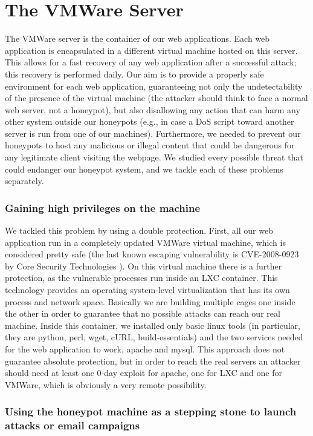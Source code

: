 \section{The VMWare Server}

The VMWare server is the container of our web applications. Each web application is encapsulated in a different virtual machine hosted on this server. This allows for a fast recovery of any web application after a successful attack; this recovery is performed daily.
Our aim is to provide a properly safe environment for each web application, guaranteeing not only the undetectability of the presence of the virtual machine (the attacker should think to face a normal web server, not a honeypot), but also disallowing any action that can harm any other system outside our honeypots (e.g., in case a DoS script toward another server is run from one of our machines). Furthermore, we needed to prevent our honeypots to host any malicious or illegal content that could be dangerous for any legitimate client visiting the webpage.
We studied every possible threat that could endanger our honeypot system, and we tackle each of these problems separately.

\subsubsection{Gaining high privileges on the machine}

 We tackled this problem by using a double protection. First, all our web application run in a completely updated VMWare virtual machine, which is considered pretty safe (the last known escaping vulnerability is CVE-2008-0923 by Core Security Technologies \cite{vmescape}). On this virtual machine there is a further protection, as the vulnerable processes run inside an LXC container. This technology provides an operating system-level virtualization that has its own process and network space. Basically we are building multiple cages one inside the other in order to guarantee that no possible attacks can reach our real machine. Inside this container, we installed only basic linux tools (in particular, they are python, perl, wget, cURL, build-essentials) and the two services needed for the web application to work, apache and mysql. This approach does not guarantee absolute protection, but in order to reach the real servers an attacker should need at least one 0-day exploit for apache, one for LXC and one for VMWare, which is obviously a very remote possibility.

\subsubsection{Using the honeypot machine as a stepping stone to launch attacks or email campaigns}

